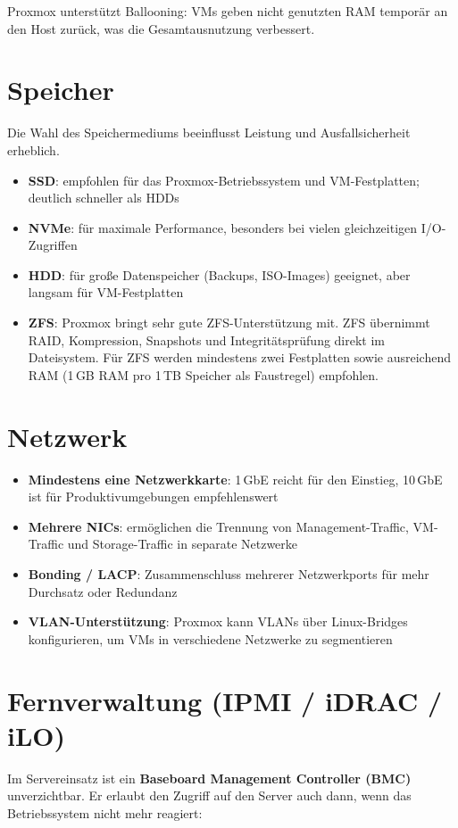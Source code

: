 \documentclass[11pt, oneside, numbers=noenddot]{scrbook}
\begin{document}
Proxmox unterstützt Ballooning: VMs geben nicht genutzten RAM temporär an den Host zurück, was die Gesamtausnutzung verbessert.

\section{Speicher}
Die Wahl des Speichermediums beeinflusst Leistung und Ausfallsicherheit erheblich.

\begin{itemize}
  \item \textbf{SSD}: empfohlen für das Proxmox-Betriebssystem und VM-Festplatten; deutlich schneller als HDDs
  \item \textbf{NVMe}: für maximale Performance, besonders bei vielen gleichzeitigen I/O-Zugriffen
  \item \textbf{HDD}: für große Datenspeicher (Backups, ISO-Images) geeignet, aber langsam für VM-Festplatten
  \item \textbf{ZFS}: Proxmox bringt sehr gute ZFS-Unterstützung mit. ZFS übernimmt RAID, Kompression, Snapshots und Integritätsprüfung direkt im Dateisystem. Für ZFS werden mindestens zwei Festplatten sowie ausreichend RAM (1\,GB RAM pro 1\,TB Speicher als Faustregel) empfohlen.
\end{itemize}

\section{Netzwerk}
\begin{itemize}
  \item \textbf{Mindestens eine Netzwerkkarte}: 1\,GbE reicht für den Einstieg, 10\,GbE ist für Produktivumgebungen empfehlenswert
  \item \textbf{Mehrere NICs}: ermöglichen die Trennung von Management-Traffic, VM-Traffic und Storage-Traffic in separate Netzwerke
  \item \textbf{Bonding / LACP}: Zusammenschluss mehrerer Netzwerkports für mehr Durchsatz oder Redundanz
  \item \textbf{VLAN-Unterstützung}: Proxmox kann VLANs über Linux-Bridges konfigurieren, um VMs in verschiedene Netzwerke zu segmentieren
\end{itemize}

\section{Fernverwaltung (IPMI / iDRAC / iLO)}
Im Servereinsatz ist ein \textbf{Baseboard Management Controller (BMC)} unverzichtbar. Er erlaubt den Zugriff auf den Server auch dann, wenn das Betriebssystem nicht mehr reagiert:
\end{document}
